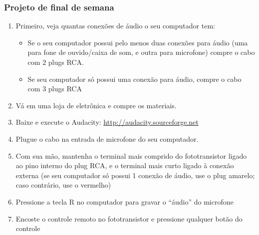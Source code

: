 \documentclass{beamer}
\begin{document}
\begin{frame}
\frametitle{Projeto de final de semana}

{\small
\begin{enumerate}
\item Primeiro, veja quantas conexões de áudio o seu computador tem:
\begin{itemize}
\item Se o seu computador possui pelo menos duas conexões
para áudio (uma para fone de ouvido/caixa de som, e outra para
microfone) compre o cabo com $2$ plugs RCA.
\item Se seu computador só possui uma conexão para áudio,
compre o cabo com $3$ plugs RCA
\end{itemize}
\pause
\item Vá em uma loja de eletrônica e compre os materiais.
\pause
\item Baixe e execute o Audacity: \url{http://audacity.sourceforge.net}
\pause
\item Plugue o cabo na entrada de microfone do seu computador.
\pause
\item Com sua mão, mantenha o terminal mais comprido do fototransistor
ligado ao pino interno do plug RCA, e o terminal mais curto ligado à conexão
externa (se seu computador só possui 1 conexão de áudio, use o plug amarelo;
caso contrário, use o vermelho)
\pause
\item Pressione a tecla R no computador para gravar o ``áudio'' do microfone
\pause
\item Encoste o controle remoto no fototransistor e pressione qualquer
botão do controle
\end{enumerate}
}
\end{frame}

\end{document}
